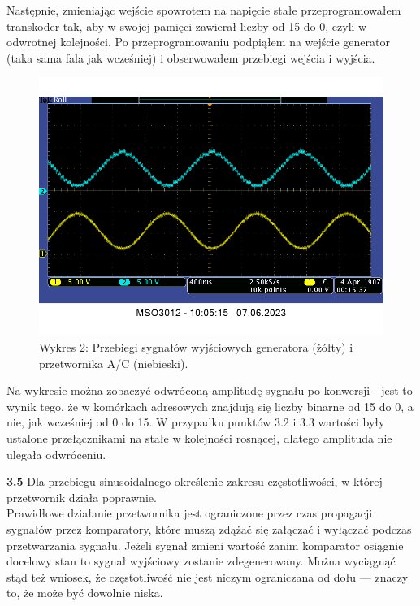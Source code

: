 \documentclass[14pt, table]{extarticle}
\begin{document}
\newpage
Następnie, zmieniając wejście spowrotem na napięcie stałe przeprogramowałem transkoder tak, aby w swojej pamięci zawierał liczby od 15 do 0, czyli w odwrotnej kolejności. Po przeprogramowaniu podpiąłem na wejście generator (taka sama fala jak wcześniej) i obserwowałem przebiegi wejścia i wyjścia.

\begin{figure}[H]
\includegraphics[width=16cm]{A2}
\centering
\captionsetup{labelformat=empty}
\caption{Wykres 2: Przebiegi sygnałów wyjściowych generatora (żółty) i przetwornika A/C (niebieski).}
\end{figure}

Na wykresie można zobaczyć odwróconą amplitudę sygnału po konwersji - jest to wynik tego, że w komórkach adresowych znajdują się liczby binarne od 15 do 0, a nie, jak wcześniej od 0 do 15. W przypadku punktów 3.2 i 3.3 wartości były ustalone przełącznikami na stałe w kolejności rosnącej, dlatego amplituda nie ulegała odwróceniu.

\newpage
\textbf{3.5} Dla przebiegu sinusoidalnego określenie zakresu częstotliwości, w której przetwornik działa poprawnie. \\

Prawidłowe działanie przetwornika jest ograniczone przez czas propagacji sygnałów przez komparatory, które muszą zdążać się załączać i wyłączać podczas przetwarzania sygnału. Jeżeli sygnał zmieni wartość zanim komparator osiągnie docelowy stan to sygnał wyjściowy zostanie zdegenerowany. Można wyciągnąć stąd też wniosek, że częstotliwość nie jest niczym ograniczana od dołu — znaczy to, że może być dowolnie niska. \\
\end{document}
